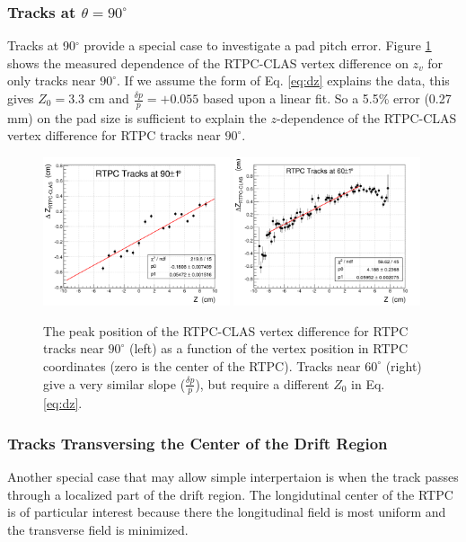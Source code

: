 \documentclass[amsmath,amssymb,notitlepage,11pt]{revtex4-1}
\begin{document}
\subsubsection{Tracks at $\theta=90^\circ$}\label{sec:90deg}
Tracks at 90$^\circ$ provide a special case to investigate a pad pitch error.
Figure \ref{fig:zdz_90deg} shows the measured dependence of the RTPC-CLAS vertex difference on $z_v$ for only tracks near $90^\circ$.  If we assume the form of Eq. \ref{eq:dz} explains the data, this gives $Z_0=3.3$ cm and $\frac{\delta p}{p}=+0.055$ based upon a linear fit.
So a 5.5\% error (0.27 mm) on the pad size is sufficient to explain the $z$-dependence of the RTPC-CLAS vertex difference for RTPC tracks near $90^\circ$.  
\begin{figure}[htbp]\centering
    \includegraphics[width=0.49\textwidth]{pics/zdz_90deg_fit_small.png}
    \includegraphics[width=0.49\textwidth]{pics/zdz_60deg_fit_small.png}
    \caption{The peak position of the RTPC-CLAS vertex difference for RTPC tracks near $90^\circ$ (left) as a function of the vertex position in RTPC coordinates (zero is the center of the RTPC).  Tracks near $60^\circ$ (right) give a very similar slope ($\frac{\delta p}{p}$), but require a different $Z_0$ in Eq. \ref{eq:dz}.\label{fig:zdz_90deg}}
\end{figure}
\subsubsection{Tracks Transversing the Center of the Drift Region}\label{sec:z0}
Another special case that may allow simple interpertaion is when the track passes through a localized part of the drift region.  The longidutinal center of the RTPC is of particular interest because there the longitudinal field is most uniform and the transverse field is minimized.
\end{document}
